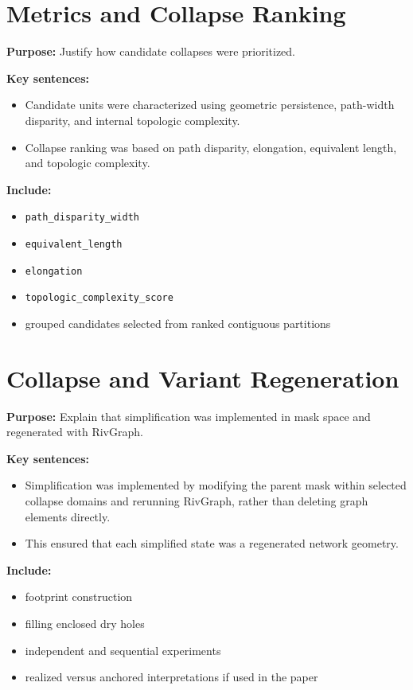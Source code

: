 \documentclass[11pt]{article}
\begin{document}
\section{Metrics and Collapse Ranking}
\textbf{Purpose:} Justify how candidate collapses were prioritized.

\textbf{Key sentences:}
\begin{itemize}
\item Candidate units were characterized using geometric persistence, path-width disparity, and internal topologic complexity.
\item Collapse ranking was based on path disparity, elongation, equivalent length, and topologic complexity.
\end{itemize}

\textbf{Include:}
\begin{itemize}
\item \texttt{path\_disparity\_width}
\item \texttt{equivalent\_length}
\item \texttt{elongation}
\item \texttt{topologic\_complexity\_score}
\item grouped candidates selected from ranked contiguous partitions
\end{itemize}

\section{Collapse and Variant Regeneration}
\textbf{Purpose:} Explain that simplification was implemented in mask space and regenerated with RivGraph.

\textbf{Key sentences:}
\begin{itemize}
\item Simplification was implemented by modifying the parent mask within selected collapse domains and rerunning RivGraph, rather than deleting graph elements directly.
\item This ensured that each simplified state was a regenerated network geometry.
\end{itemize}

\textbf{Include:}
\begin{itemize}
\item footprint construction
\item filling enclosed dry holes
\item independent and sequential experiments
\item realized versus anchored interpretations if used in the paper
\end{itemize}
\end{document}
